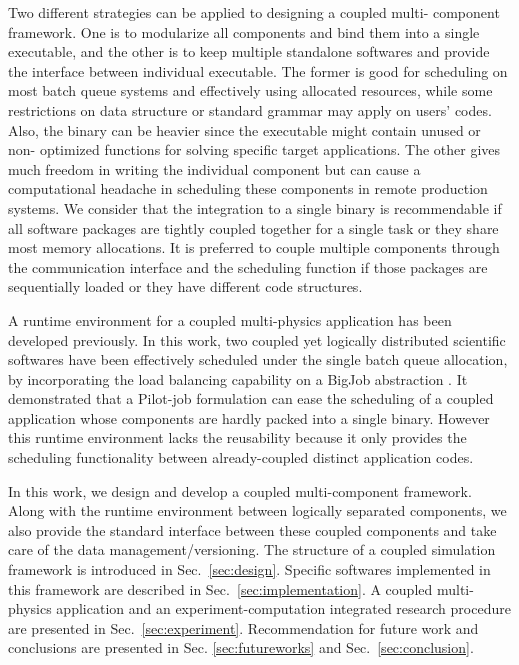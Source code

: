 \documentclass[10pt,conference]{IEEEtran}
\begin{document}
Two different strategies can be applied to designing a coupled multi-
component framework. One is to modularize all components and bind them 
into a single executable, and the other is to keep multiple standalone 
softwares and provide the interface between individual executable. The 
former is good for scheduling on most batch queue systems and 
effectively using allocated resources, while some restrictions on data 
structure or standard grammar may apply on users' codes. Also, the 
binary can be heavier since the executable might contain unused or non-
optimized functions for solving specific target applications. The other 
gives much freedom in writing the individual component but can cause a 
computational headache in scheduling these components in remote 
production systems. We consider that the integration to a single binary 
is recommendable if all software packages are tightly coupled together 
for a single task or they share most memory allocations. It is 
preferred to couple multiple components through the communication 
interface and the scheduling function if those packages are 
sequentially loaded or they have different code structures.

A runtime environment for a coupled multi-physics application \cite
{CCGrid_Hybrid} has been developed previously. In this work, two 
coupled yet logically distributed scientific softwares have been 
effectively scheduled under the single batch queue allocation, by 
incorporating the load balancing capability on a BigJob abstraction 
\cite{repex_ptrsa}. It demonstrated that a Pilot-job formulation can 
ease the scheduling of a coupled application whose components are 
hardly packed into a single binary. However this runtime environment 
lacks the reusability because it only provides the scheduling 
functionality between already-coupled distinct application codes.

In this work, we design and develop a coupled multi-component 
framework. Along with the runtime environment between logically 
separated components, we also provide the standard interface between 
these coupled components and take care of the data 
management/versioning. The structure of a coupled simulation framework 
is introduced in Sec.~\ref{sec:design}. Specific softwares implemented in this framework are described in Sec.~\ref{sec:implementation}. A 
coupled multi-physics application and an experiment-computation 
integrated research procedure are presented in Sec.~\ref{sec:experiment}. 
Recommendation for future work and conclusions are presented in Sec. 
\ref{sec:futureworks} and Sec.~\ref{sec:conclusion}.
\end{document}
